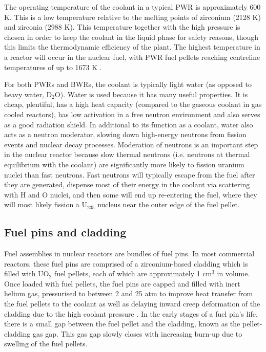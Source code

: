 The operating temperature of the coolant in a typical PWR is approximately 600 K. This is a low temperature relative to the melting points of zirconium (2128 K) and zirconia (2988 K). This temperature together with the high pressure is chosen in order to keep the coolant in the liquid phase for safety reasons, though this limits the thermodynamic efficiency of the plant. The highest temperature in a reactor will occur in the nuclear fuel, with PWR fuel pellets reaching centreline temperatures of up to 1673 K \cite{beyer1998review}.

For both PWRs and BWRs, the coolant is typically light water (as opposed to heavy water, D$_{2}$O). Water is used because it has many useful properties. It is cheap, plentiful, has a high heat capacity (compared to the gaseous coolant in gas cooled reactors), has low activation in a free neutron environment and also serves as a good radiation shield. In additional to its function as a coolant, water also acts as a neutron moderator, slowing down high-energy neutrons from fission events and nuclear decay processes. Moderation of neutrons is an important step in the nuclear reactor because slow thermal neutrons (i.e. neutrons at thermal equilibrium with the coolant) are significantly more likely to fission uranium nuclei than fast neutrons. Fast neutrons will typically escape from the fuel after they are generated, dispense most of their energy in the coolant via scattering with H and O nuclei, and then some will end up re-entering the fuel, where they will most likely fission a U$_{235}$ nucleus near the outer edge of the fuel pellet.


\subsection{Fuel pins and cladding}

Fuel assemblies in nuclear reactors are bundles of fuel pins. In most commercial reactors, these fuel pins are comprised of a zirconium-based cladding which is filled with UO$_{2}$ fuel pellets, each of which are approximately 1 cm$^{3}$ in volume. Once loaded with fuel pellets, the fuel pins are capped and filled with inert helium gas, pressurised to between 2 and 25 atm to improve heat transfer from the fuel pellets to the coolant as well as delaying inward creep deformation of the cladding due to the high coolant pressure \cite{King1980}. In the early stages of a fuel pin's life, there is a small gap between the fuel pellet and the cladding, known as the pellet-cladding gas gap. This gas gap slowly closes with increasing burn-up due to swelling of the fuel pellets.

